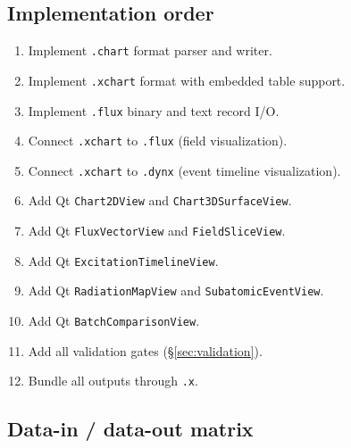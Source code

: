 \documentclass[11pt, a4paper, oneside]{article}
\begin{document}
\subsection{Implementation order}

\begin{enumerate}
  \item Implement \texttt{.chart} format parser and writer.
  \item Implement \texttt{.xchart} format with embedded table support.
  \item Implement \texttt{.flux} binary and text record I/O.
  \item Connect \texttt{.xchart} to \texttt{.flux} (field visualization).
  \item Connect \texttt{.xchart} to \texttt{.dynx} (event timeline visualization).
  \item Add Qt \texttt{Chart2DView} and \texttt{Chart3DSurfaceView}.
  \item Add Qt \texttt{FluxVectorView} and \texttt{FieldSliceView}.
  \item Add Qt \texttt{ExcitationTimelineView}.
  \item Add Qt \texttt{RadiationMapView} and \texttt{SubatomicEventView}.
  \item Add Qt \texttt{BatchComparisonView}.
  \item Add all validation gates (\S\ref{sec:validation}).
  \item Bundle all outputs through \texttt{.x}.
\end{enumerate}

\subsection{Data-in / data-out matrix}
\end{document}
